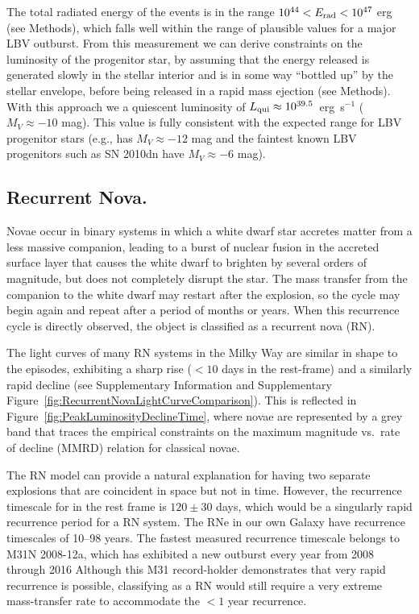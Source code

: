 The total radiated energy of the \spock events is in the range
$10^{44}<E_{\rm rad}<10^{47}$ erg (see Methods), which falls well
within the range of plausible values for a major LBV outburst.  From
this measurement we can derive constraints on the luminosity of the
progenitor star, by assuming that the energy released is generated
slowly in the stellar interior and is in some way ``bottled up'' by
the stellar envelope, before being released in a rapid mass ejection
(see Methods).  With this approach we a quiescent luminosity of
$L_{\rm qui}\approx10^{39.5}$~erg~s$^{-1}$ ($M_V\approx-10$ mag).  This value is
fully consistent with the expected range for LBV progenitor stars
(e.g., \etacar has $M_V\approx-12$ mag and the faintest known LBV progenitors
such as SN 2010dn have $M_V\approx-6$ mag).


\subsection{Recurrent Nova.}\label{sec:RNe}

Novae occur in binary systems in which a white dwarf star accretes
matter from a less massive companion, leading to a burst of nuclear
fusion in the accreted surface layer that causes the white dwarf to
brighten by several orders of magnitude, but does not completely
disrupt the star. The mass transfer from the companion to the white
dwarf may restart after the explosion, so the cycle may begin again
and repeat after a period of months or years.  When this recurrence
cycle is directly observed, the object is classified as a recurrent
nova (RN).

The light curves of many RN systems in the Milky Way are similar in
shape to the \spock episodes, exhibiting a sharp rise ($<10$ days in
the rest-frame) and a similarly rapid decline (see Supplementary
Information and Supplementary
Figure~\ref{fig:RecurrentNovaLightCurveComparison}).  This is
reflected in Figure~\ref{fig:PeakLuminosityDeclineTime}, where novae
are represented by a grey band that traces the empirical constraints
on the maximum magnitude vs.\ rate of decline (MMRD) relation for
classical novae\cite{DellaValle:1995, Downes:2000}.

The RN model can provide a natural explanation for having two separate
explosions that are coincident in space but not in time.  However, the
recurrence timescale for \spock in the rest frame is $120\pm30$ days,
which would be a singularly rapid recurrence period for a RN system.
The RNe in our own Galaxy have recurrence timescales of 10--98
years\cite{Schaefer:2010}.  The fastest measured recurrence timescale
belongs to M31N 2008-12a, which has exhibited a new outburst every
year from 2008 through 2016\cite{Tang:2014, Darnley:2016}
Although this M31 record-holder demonstrates that very rapid
recurrence is possible, classifying \spock as a RN would still require
a very extreme mass-transfer rate to accommodate the $<1$ year
recurrence.

